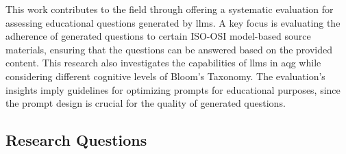 This work contributes to the field through offering a systematic evaluation for assessing educational questions generated by \ac{llms}. A key focus is evaluating the adherence of generated questions to certain ISO-OSI model-based source materials, ensuring that the questions can be answered based on the provided content. This research also investigates the capabilities of \ac{llms} in \ac{aqg} while considering different cognitive levels of Bloom's Taxonomy. The evaluation's insights imply guidelines for optimizing prompts for educational purposes, since the prompt design is crucial for the quality of generated questions.





\subsection{Research Questions}

